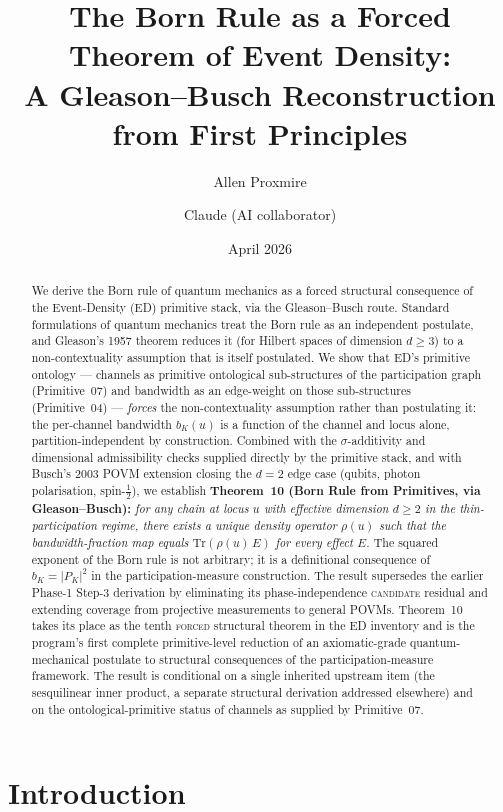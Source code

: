 \documentclass[11pt,a4paper]{article}
\title{The Born Rule as a Forced Theorem of Event Density:\\ A Gleason--Busch Reconstruction from First Principles}
\author{Allen Proxmire \and Claude (AI collaborator)}
\date{April 2026}
\begin{document}
\maketitle

\begin{abstract}
We derive the Born rule of quantum mechanics as a forced structural consequence of the Event-Density (ED) primitive stack, via the Gleason--Busch route. Standard formulations of quantum mechanics treat the Born rule as an independent postulate, and Gleason's 1957 theorem reduces it (for Hilbert spaces of dimension $d \geq 3$) to a non-contextuality assumption that is itself postulated. We show that ED's primitive ontology --- channels as primitive ontological sub-structures of the participation graph (Primitive~07) and bandwidth as an edge-weight on those sub-structures (Primitive~04) --- \emph{forces} the non-contextuality assumption rather than postulating it: the per-channel bandwidth $b_K(u)$ is a function of the channel and locus alone, partition-independent by construction. Combined with the $\sigma$-additivity and dimensional admissibility checks supplied directly by the primitive stack, and with Busch's 2003 POVM extension closing the $d = 2$ edge case (qubits, photon polarisation, spin-$\tfrac{1}{2}$), we establish \textbf{Theorem~10 (Born Rule from Primitives, via Gleason--Busch):} \emph{for any chain at locus $u$ with effective dimension $d \geq 2$ in the thin-participation regime, there exists a unique density operator $\rho(u)$ such that the bandwidth-fraction map equals $\mathrm{Tr}(\rho(u)\, E)$ for every effect $E$.} The squared exponent of the Born rule is not arbitrary; it is a definitional consequence of $b_K = |P_K|^2$ in the participation-measure construction. The result supersedes the earlier Phase-1 Step-3 derivation by eliminating its phase-independence \textsc{candidate} residual and extending coverage from projective measurements to general POVMs. Theorem~10 takes its place as the tenth \textsc{forced} structural theorem in the ED inventory and is the program's first complete primitive-level reduction of an axiomatic-grade quantum-mechanical postulate to structural consequences of the participation-measure framework. The result is conditional on a single inherited upstream item (the sesquilinear inner product, a separate structural derivation addressed elsewhere) and on the ontological-primitive status of channels as supplied by Primitive~07.
\end{abstract}

\section{Introduction}
\end{document}
